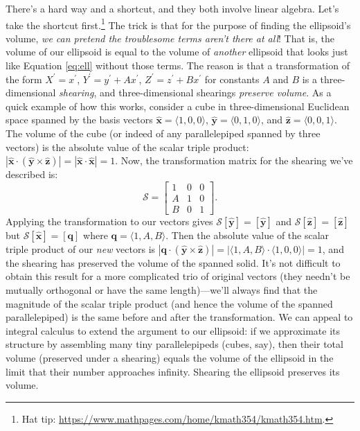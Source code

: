 \documentclass[12pt]{article}
\renewcommand{\vv}[1]{\mathbf{#1}}
\begin{document}
There's a hard way and a shortcut, and they both involve linear algebra. Let's take the shortcut first.\footnote{Hat tip: \url{https://www.mathpages.com/home/kmath354/kmath354.htm}.} The trick is that for the purpose of finding the ellipsoid's volume, \emph{we can pretend the troublesome terms aren't there at all}! That is, the volume of our ellipsoid is equal to the volume of \emph{another} ellipsoid that looks just like Equation \ref{eq:ell} without those terms. The reason is that a transformation of the form $X^\prime = x^\prime$, $Y^\prime = y^\prime + A x^\prime$, $Z^\prime = z^\prime + B x^\prime$ for constants $A$ and $B$ is a three-dimensional \emph{shearing}, and three-dimensional shearings \emph{preserve volume}. As a quick example of how this works, consider a cube in three-dimensional Euclidean space spanned by the basis vectors $\vv{\hat{x}} = \langle 1, 0, 0 \rangle$, $\vv{\hat{y}} = \langle 0, 1, 0 \rangle$, and $\vv{\hat{z}} = \langle 0, 0, 1 \rangle$. The volume of the cube (or indeed of any parallelepiped spanned by three vectors) is the absolute value of the scalar triple product: $| \vv{\hat{x}} \cdot (\vv{\hat{y}} \times \vv{\hat{z}}) | = | \vv{\hat{x}} \cdot \vv{\hat{x}} | = 1$. Now, the transformation matrix for the shearing we've described is:
\begin{equation*}
\mathcal{S} =
\begin{bmatrix}
1 & 0 & 0 \\
A & 1 & 0 \\
B & 0 & 1
\end{bmatrix}.
\end{equation*}
Applying the transformation to our vectors gives $\mathcal{S} [\vv{\hat{y}}] = [\vv{\hat{y}}]$ and $\mathcal{S} [\vv{\hat{z}}] = [\vv{\hat{z}}]$ but $\mathcal{S} [\vv{\hat{x}}] = [ \vv q ]$ where $\vv q = \langle 1, A, B \rangle$. Then the absolute value of the scalar triple product of our \emph{new} vectors is ${| \vv q \cdot (\vv{\hat{y}} \times \vv{\hat{z}}) | = | \langle 1, A, B \rangle \cdot \langle 1, 0, 0 \rangle | = 1}$, and the shearing has preserved the volume of the spanned solid. It's not difficult to obtain this result for a more complicated trio of original vectors (they needn't be mutually orthogonal or have the same length)---we'll always find that the magnitude of the scalar triple product (and hence the volume of the spanned parallelepiped) is the same before and after the transformation. We can appeal to integral calculus to extend the argument to our ellipsoid: if we approximate its structure by assembling many tiny parallelepipeds (cubes, say), then their total volume (preserved under a shearing) equals the volume of the ellipsoid in the limit that their number approaches infinity. Shearing the ellipsoid preserves its volume.
\end{document}
